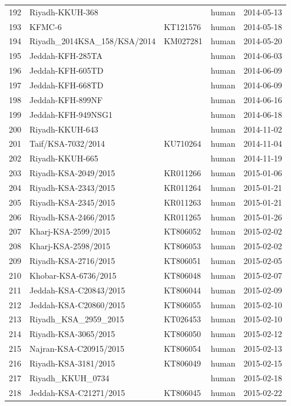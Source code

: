 \documentclass[11pt,oneside,letterpaper]{article}
\begin{document}
\begin{longtable}{ | l | l | l | l | l | }
  192 & Riyadh-KKUH-368 &  & human & 2014-05-13 \\
  193 & KFMC-6 & KT121576 & human & 2014-05-18 \\
  194 & Riyadh\_2014KSA\_158/KSA/2014 & KM027281 & human & 2014-05-20 \\
  195 & Jeddah-KFH-285TA &  & human & 2014-06-03 \\
  196 & Jeddah-KFH-605TD &  & human & 2014-06-09 \\
  197 & Jeddah-KFH-668TD &  & human & 2014-06-09 \\
  198 & Jeddah-KFH-899NF &  & human & 2014-06-16 \\
  199 & Jeddah-KFH-949NSG1 &  & human & 2014-06-18 \\
  200 & Riyadh-KKUH-643 &  & human & 2014-11-02 \\
  201 & Taif/KSA-7032/2014 & KU710264 & human & 2014-11-04 \\
  202 & Riyadh-KKUH-665 &  & human & 2014-11-19 \\
  203 & Riyadh-KSA-2049/2015 & KR011266 & human & 2015-01-06 \\
  204 & Riyadh-KSA-2343/2015 & KR011264 & human & 2015-01-21 \\
  205 & Riyadh-KSA-2345/2015 & KR011263 & human & 2015-01-21 \\
  206 & Riyadh-KSA-2466/2015 & KR011265 & human & 2015-01-26 \\
  207 & Kharj-KSA-2599/2015 & KT806052 & human & 2015-02-02 \\
  208 & Kharj-KSA-2598/2015 & KT806053 & human & 2015-02-02 \\
  209 & Riyadh-KSA-2716/2015 & KT806051 & human & 2015-02-05 \\
  210 & Khobar-KSA-6736/2015 & KT806048 & human & 2015-02-07 \\
  211 & Jeddah-KSA-C20843/2015 & KT806044 & human & 2015-02-09 \\
  212 & Jeddah-KSA-C20860/2015 & KT806055 & human & 2015-02-10 \\
  213 & Riyadh\_KSA\_2959\_2015 & KT026453 & human & 2015-02-10 \\
  214 & Riyadh-KSA-3065/2015 & KT806050 & human & 2015-02-12 \\
  215 & Najran-KSA-C20915/2015 & KT806054 & human & 2015-02-13 \\
  216 & Riyadh-KSA-3181/2015 & KT806049 & human & 2015-02-15 \\
  217 & Riyadh\_KKUH\_0734 &  & human & 2015-02-18 \\
  218 & Jeddah-KSA-C21271/2015 & KT806045 & human & 2015-02-22 \\

\end{longtable}
\end{document}
